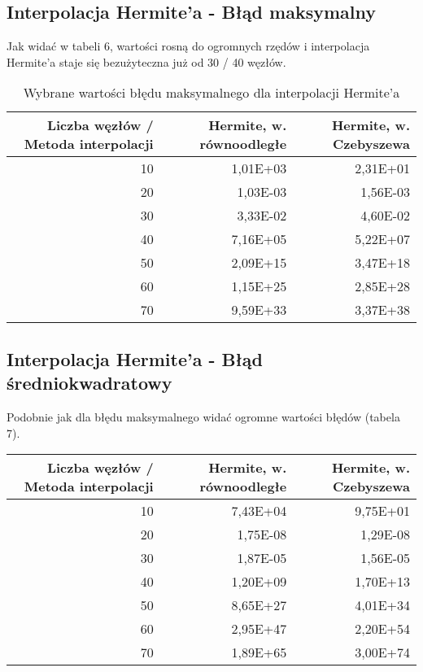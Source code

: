 \documentclass{article}
\begin{document}
\subsection{Interpolacja Hermite'a - Błąd maksymalny}

Jak widać w tabeli 6, wartości rosną do ogromnych rzędów i interpolacja Hermite'a staje się bezużyteczna już od 30 / 40 węzłów.

\begin{table}[H]
    \centering
    \begin{tabular}{|r|r|r|}
    \hline
        Liczba węzłów / Metoda interpolacji  & Hermite, w. równoodległe & Hermite, w. Czebyszewa  \\ \hline
        10  & 1,01E+03 & 2,31E+01  \\ \hline
        20  & 1,03E-03 & 1,56E-03  \\ \hline
        30  & 3,33E-02 & 4,60E-02  \\ \hline
        40  & 7,16E+05 & 5,22E+07  \\ \hline
        50  & 2,09E+15 & 3,47E+18  \\ \hline
        60  & 1,15E+25 & 2,85E+28  \\ \hline
        70 & 9,59E+33 & 3,37E+38 \\ \hline
    \end{tabular}
    \caption{Wybrane wartości błędu maksymalnego dla interpolacji Hermite'a}
\end{table}

\subsection{Interpolacja Hermite'a - Błąd średniokwadratowy}

Podobnie jak dla błędu maksymalnego widać ogromne wartości błędów (tabela 7).

\begin{table}[!ht]
    \centering
    \begin{tabular}{|r|r|r|}
    \hline
        Liczba węzłów / Metoda interpolacji & Hermite, w. równoodległe & Hermite, w. Czebyszewa  \\ \hline
        10 & 7,43E+04 & 9,75E+01  \\ \hline
        20 & 1,75E-08 & 1,29E-08  \\ \hline
        30 & 1,87E-05 & 1,56E-05  \\ \hline
        40 & 1,20E+09 & 1,70E+13  \\ \hline
        50 & 8,65E+27 & 4,01E+34  \\ \hline
        60 & 2,95E+47 & 2,20E+54  \\ \hline
        70 & 1,89E+65 & 3,00E+74 \\ \hline
    \end{tabular}
\end{table}
\end{document}
